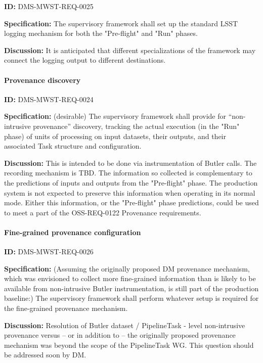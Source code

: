 \documentclass[SE,toc,lsstdraft]{lsstdoc}
\begin{document}
\label{DMS-MWST-REQ-0025}
\textbf{ID:} DMS-MWST-REQ-0025

\textbf{Specification:}
The supervisory framework shall set up the standard LSST logging mechanism for both the "Pre-flight" and "Run" phases.

\textbf{Discussion:}
It is anticipated that different specializations of the framework may connect the logging output to different destinations.

\paragraph{Provenance discovery}\hfill  %

\label{DMS-MWST-REQ-0024}
\textbf{ID:} DMS-MWST-REQ-0024

\textbf{Specification:}
(desirable) The supervisory framework shall provide for “non-intrusive provenance” discovery, tracking the actual execution (in the "Run" phase) of units of processing on input datasets, their outputs, and their associated Task structure and configuration.

\textbf{Discussion:}
This is intended to be done via instrumentation of Butler calls. The recording mechanism is TBD. The information so collected is complementary to the predictions of inputs and outputs from the "Pre-flight" phase. The production system is not expected to preserve this information when operating in its normal mode.  Either this information, or the "Pre-flight" phase predictions, could be used to meet a part of the OSS-REQ-0122 Provenance requirements.

\paragraph{Fine-grained provenance configuration}\hfill  %

\label{DMS-MWST-REQ-0026}
\textbf{ID:} DMS-MWST-REQ-0026

\textbf{Specification:}
(Assuming the originally proposed DM provenance mechanism, which was envisioned to collect more fine-grained information than is likely to be available from non-intrusive Butler instrumentation, is still part of the production baseline:) The supervisory framework shall perform whatever setup is required for the fine-grained provenance mechanism.

\textbf{Discussion:}
Resolution of Butler dataset / PipelineTask - level non-intrusive provenance versus – or in addition to – the originally proposed provenance mechanism was beyond the scope of the PipelineTask WG. This question should be addressed soon by DM.
\end{document}
